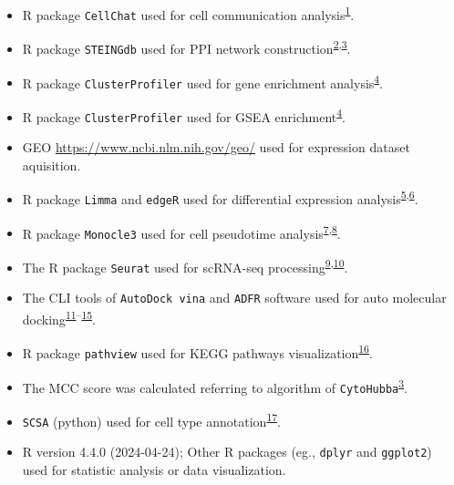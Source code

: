 \documentclass[
]{article}
\providecommand{\tightlist}{%
  \setlength{\itemsep}{0pt}\setlength{\parskip}{0pt}}
\begin{document}
\begin{itemize}
\tightlist
\item
  R package \texttt{CellChat} used for cell communication analysis\textsuperscript{\protect\hyperlink{ref-InferenceAndAJinS2021}{1}}.
\item
  R package \texttt{STEINGdb} used for PPI network construction\textsuperscript{\protect\hyperlink{ref-TheStringDataSzklar2021}{2},\protect\hyperlink{ref-CytohubbaIdenChin2014}{3}}.
\item
  R package \texttt{ClusterProfiler} used for gene enrichment analysis\textsuperscript{\protect\hyperlink{ref-ClusterprofilerWuTi2021}{4}}.
\item
  R package \texttt{ClusterProfiler} used for GSEA enrichment\textsuperscript{\protect\hyperlink{ref-ClusterprofilerWuTi2021}{4}}.
\item
  GEO \url{https://www.ncbi.nlm.nih.gov/geo/} used for expression dataset aquisition.
\item
  R package \texttt{Limma} and \texttt{edgeR} used for differential expression analysis\textsuperscript{\protect\hyperlink{ref-LimmaPowersDiRitchi2015}{5},\protect\hyperlink{ref-EdgerDifferenChen}{6}}.
\item
  R package \texttt{Monocle3} used for cell pseudotime analysis\textsuperscript{\protect\hyperlink{ref-ReversedGraphQiuX2017}{7},\protect\hyperlink{ref-TheDynamicsAnTrapne2014}{8}}.
\item
  The R package \texttt{Seurat} used for scRNA-seq processing\textsuperscript{\protect\hyperlink{ref-IntegratedAnalHaoY2021}{9},\protect\hyperlink{ref-ComprehensiveIStuart2019}{10}}.
\item
  The CLI tools of \texttt{AutoDock\ vina} and \texttt{ADFR} software used for auto molecular docking\textsuperscript{\protect\hyperlink{ref-AutodockVina1Eberha2021}{11}--\protect\hyperlink{ref-AutodockfrAdvRavind2015}{15}}.
\item
  R package \texttt{pathview} used for KEGG pathways visualization\textsuperscript{\protect\hyperlink{ref-PathviewAnRLuoW2013}{16}}.
\item
  The MCC score was calculated referring to algorithm of \texttt{CytoHubba}\textsuperscript{\protect\hyperlink{ref-CytohubbaIdenChin2014}{3}}.
\item
  \texttt{SCSA} (python) used for cell type annotation\textsuperscript{\protect\hyperlink{ref-ScsaACellTyCaoY2020}{17}}.
\item
  R version 4.4.0 (2024-04-24); Other R packages (eg., \texttt{dplyr} and \texttt{ggplot2}) used for statistic analysis or data visualization.
\end{itemize}
\end{document}
